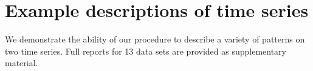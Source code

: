 \documentclass[letterpaper]{article}
\def\eg{e.g.\ }
\begin{document}









\section{Example descriptions of time series}
\label{sec:examples}
We demonstrate the ability of our procedure to describe a variety of patterns on two time series.
Full reports for 13 data sets are provided as supplementary material.
\end{document}
